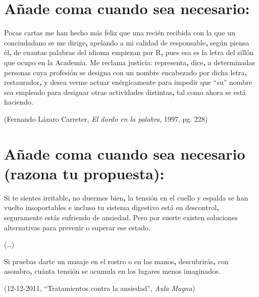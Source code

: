 \documentclass[12pt, a4paper, oneside]{report}
\begin{document}
        \section{Añade coma cuando sea necesario:}
        Pocas cartas me han hecho más feliz que una recién recibida con la que un conciudadano se me
        dirige\color{verde}\textbf{,}\color{negro} \;apelando a mi calidad de
        responsable\color{verde}\textbf{,}\color{negro} \;según piensa él\color{verde}\textbf{,}\color{negro}
        \;de cuantas palabras del idioma empiezan por R\color{verde}\textbf{,}\color{negro} \;pues esa es la
        letra del sillón que ocupo en la Academia. Me reclama justicia: representa\color{verde}\textbf{,}
        \color{negro}dice\color{verde}\textbf{,}\color{negro} \;a determinadas personas cuya profesión se
        designa con un nombre encabezado por dicha letra\color{verde}\textbf{,}\color{negro}
        \;restaurador\color{verde}\textbf{,}\color{negro} \;y desea verme actuar enérgicamente para impedir
        que ``su'' nombre sea empleado para designar otras actividades distintas\color{verde}\textbf{,}
        \color{negro}tal como ahora se está haciendo.
        \begin{flushright}
            (Fernando Lázaro Carreter, \textit{El dardo en la palabra}, 1997, pg. 228)
        \end{flushright}
    \section{Añade coma cuando sea necesario (razona tu propuesta):}
        Si te sientes irritable\color{verde}\textbf{,}\color{negro} \;no duermes bien\color{verde}\textbf{,}
        \color{negro}la tensión en el cuello y espalda se han vuelto insoportables e incluso tu sistema
        digestivo está en descontrol\color{verde}\textbf{,}\color{negro} \;seguramente estás sufriendo de
        ansiedad. Pero por suerte existen soluciones alternativas para prevenir o superar ese estado.

        (…)

        Si pruebas darte un masaje en el rostro o en las manos\color{verde}\textbf{,}\color{negro}
        \;descubrirás\color{verde}\textbf{,}\color{negro} \;con asombro\color{verde}\textbf{,}\color{negro}
        \;cuánta tensión se acumula en los lugares menos imaginados.
        \begin{flushright}
            (12-12-2011, “Tratamientos contra la ansiedad”, \textit{Aula Magna})
        \end{flushright}
        \clearpage
\end{document}
